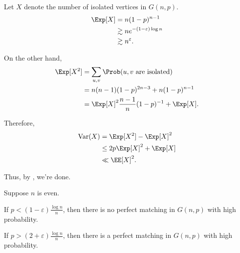 \begin{dem} Let $X$ denote the number of isolated vertices in $G(n, p)$.
	\begin{align*}
		\Exp[X] &= n(1-p)^{n-1} \\
				&\gtrsim ne^{-(1-\varepsilon)\log{n}}\\
				&\gtrsim n^\varepsilon.
	\end{align*}

	On the other hand, 
	\begin{align*}
		\Exp[X^2] &= \sum_{u, v} \Prob(u, v \text{ are isolated})\\
				  &= n(n-1)(1-p)^{2n-3} + n(1-p)^{n-1}\\
				  &= \Exp[X]^2 \frac{n-1}{n}(1-p)^{-1} + \Exp[X].
	\end{align*}

	Therefore, 
	\begin{align*}
		\Var(X) &= \Exp[X^2] - \Exp[X]^2\\
				&\le 2p\Exp[X]^2 + \Exp[X]\\
				&\ll \EE[X]^2.
	\end{align*}

	Thus, by , we're done.
\end{dem}

\begin{thm}
	Suppose $n$ is even.

	If $p < (1-\varepsilon)\frac{\log{n}}{n}$, then there is no perfect matching in $G(n, p)$ with high probability.

	If $p > (2+\varepsilon)\frac{\log{n}}{n}$, then there is a perfect matching in $G(n, p)$ with high probability.
\end{thm}

